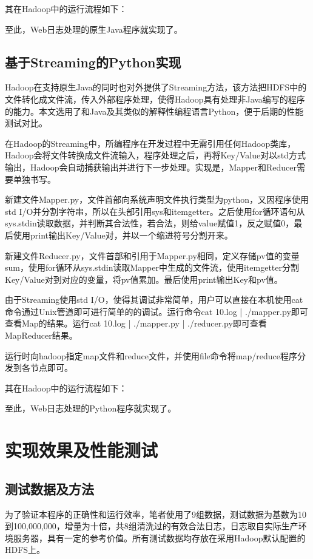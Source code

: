其在Hadoop中的运行流程如下：

至此，Web日志处理的原生Java程序就实现了。

\subsection{基于Streaming的Python实现}
Hadoop在支持原生Java的同时也对外提供了Streaming方法，该方法把HDFS中的文件转化成文件流，传入外部程序处理，使得Hadoop具有处理非Java编写的程序的能力。本文选用了和Java及其类似的解释性编程语言Python，便于后期的性能测试对比。

在Hadoop的Streaming中，所编程序在开发过程中无需引用任何Hadoop类库，Hadoop会将文件转换成文件流输入，程序处理之后，再将Key/Value对以std方式输出，Hadoop会自动捕获输出并进行下一步处理。实现是，Mapper和Reducer需要单独书写。

新建文件Mapper.py，文件首部向系统声明文件执行类型为python，又因程序使用std I/O并分割字符串，所以在头部引用sys和itemgetter。之后使用for循环语句从sys.stdin读取数据，并判断其合法性，若合法，则给value赋值1，反之赋值0，最后使用print输出Key/Value对，并以一个缩进符号分割开来。

新建文件Reducer.py，文件首部和引用于Mapper.py相同，定义存储pv值的变量sum，使用for循环从sys.stdin读取Mapper中生成的文件流，使用itemgetter分割Key/Value对到对应的变量，将pv值累加。最后使用print输出Key和pv值。

由于Streaming使用std I/O，使得其调试非常简单，用户可以直接在本机使用cat命令通过Unix管道即可进行简单的的调试。运行命令cat 10.log | ./mapper.py即可查看Map的结果。运行cat 10.log | ./mapper.py | ./reducer.py即可查看MapReducer结果。

运行时向hadoop指定map文件和reduce文件，并使用file命令将map/reduce程序分发到各节点即可。


其在Hadoop中的运行流程如下：

至此，Web日志处理的Python程序就实现了。

\section{实现效果及性能测试}
\subsection{测试数据及方法}
为了验证本程序的正确性和运行效率，笔者使用了9组数据，测试数据为基数为10到100,000,000，增量为十倍，共8组清洗过的有效合法日志，日志取自实际生产环境服务器，具有一定的参考价值。所有测试数据均存放在采用Hadoop默认配置的HDFS上。

